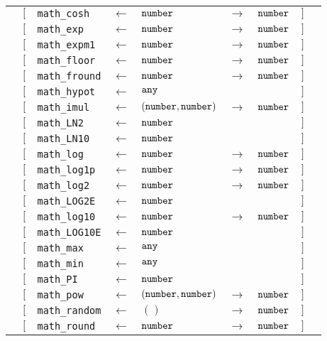 \begin{tabular}[fragile]{lllllllll}
& $[$ & \texttt{math\_cosh} & $\leftarrow$  & $\texttt{number}$ & $\rightarrow$ & $\texttt{number}$ & $]$ \\
& $[$ & \texttt{math\_exp} & $\leftarrow$  & $\texttt{number}$ & $\rightarrow$ & $\texttt{number}$ & $]$ \\
& $[$ & \texttt{math\_expm1} & $\leftarrow$  & $\texttt{number}$ & $\rightarrow$ & $\texttt{number}$ & $]$ \\
& $[$ & \texttt{math\_floor} & $\leftarrow$  & $\texttt{number}$ & $\rightarrow$ & $\texttt{number}$ & $]$ \\
& $[$ & \texttt{math\_fround} & $\leftarrow$  & $\texttt{number}$ & $\rightarrow$ & $\texttt{number}$ & $]$ \\
& $[$ & \texttt{math\_hypot} & $\leftarrow$  & $\texttt{any}$ & & & $]$ \\
& $[$ & \texttt{math\_imul} & $\leftarrow$  & $(\texttt{number}, \texttt{number})$ & $\rightarrow$ & $\texttt{number}$ & $]$ \\
& $[$ & \texttt{math\_LN2} & $\leftarrow$  & $\texttt{number}$ & & & $]$ \\
& $[$ & \texttt{math\_LN10} & $\leftarrow$  & $\texttt{number}$ & & & $]$ \\
& $[$ & \texttt{math\_log} & $\leftarrow$  & $\texttt{number}$ & $\rightarrow$ & $\texttt{number}$ & $]$ \\
& $[$ & \texttt{math\_log1p} & $\leftarrow$  & $\texttt{number}$ & $\rightarrow$ & $\texttt{number}$ & $]$ \\
& $[$ & \texttt{math\_log2} & $\leftarrow$  & $\texttt{number}$ & $\rightarrow$ & $\texttt{number}$ & $]$ \\
& $[$ & \texttt{math\_LOG2E} & $\leftarrow$  & $\texttt{number}$ & & & $]$ \\
& $[$ & \texttt{math\_log10} & $\leftarrow$  & $\texttt{number}$ & $\rightarrow$ & $\texttt{number}$ & $]$ \\
& $[$ & \texttt{math\_LOG10E} & $\leftarrow$  & $\texttt{number}$ & & & $]$ \\
& $[$ & \texttt{math\_max} & $\leftarrow$  & $\texttt{any}$ & & & $]$ \\
& $[$ & \texttt{math\_min} & $\leftarrow$  & $\texttt{any}$ & & & $]$ \\
& $[$ & \texttt{math\_PI} & $\leftarrow$  & $\texttt{number}$ & & & $]$ \\
& $[$ & \texttt{math\_pow} & $\leftarrow$  & $(\texttt{number}, \texttt{number})$ & $\rightarrow$ & $\texttt{number}$ & $]$ \\
& $[$ & \texttt{math\_random} & $\leftarrow$  & $()$ & $\rightarrow$ & $\texttt{number}$ & $]$ \\
& $[$ & \texttt{math\_round} & $\leftarrow$  & $\texttt{number}$ & $\rightarrow$ & $\texttt{number}$ & $]$ \\

\end{tabular}
